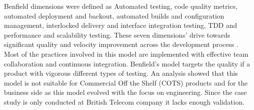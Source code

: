 \documentclass[a4paper,oneside]{bth}
\begin{document}
Benfield dimensions were defined as Automated testing, code quality metrics, automated deployment and backout, automated builds and configuration management, interlocked delivery and interface integration testing, TDD and performance and scalability testing. These seven dimensions’ drive towards significant quality and velocity improvement across the development process \cite{benefield_seven_2010}. Most of the practices involved in this model are implemented with effective team collaboration and continuous integration. Benfield’s model targets the quality if a product with vigorous different types of testing. An analysis showed that this model is not suitable for Commercial Off the Shelf (COTS) products and for the business side as this model evolved with the focus on engineering. Since the case study is only conducted at British Telecom company it lacks enough validation.
\end{document}
